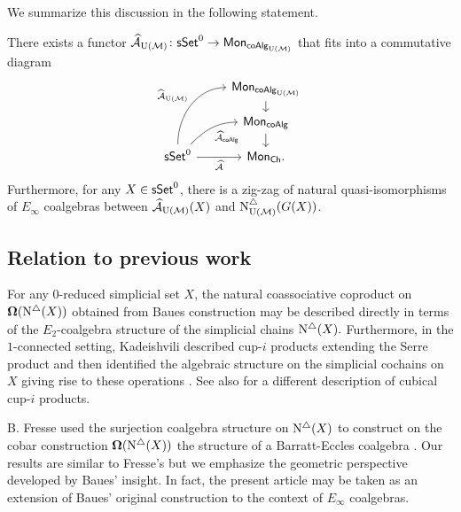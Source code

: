 We summarize this discussion in the following statement.

\begin{theorem} \label{t:2nd main thm in the intro} There exists a functor $\operatorname{\mathcal{\widehat{A}}}_{\mathrm{U}(\mathcal{M})} \colon \mathsf{sSet}^0 \to \mathsf{Mon}_{\mathsf{coAlg}_{\mathrm{U}(\mathcal{M})}}$ that fits into a commutative diagram
	\begin{equation*}
	\begin{tikzcd}[row sep=small]
	& \Mon_{\coAlg_\UM} \arrow[d] \\
	& \Mon_{\coAlg} \arrow[d] \\
	\sSet^0
	\arrow[r, "\Ahat"', ]
	\arrow[ru, "\Ahat_{\coAlg}"', out=45, in=180] 
	\arrow[ruu, "\widehat{\A}_\UM", out=90, in=180]
	& \Mon_{\Ch}.
	\end{tikzcd}
	\end{equation*}
	Furthermore, for any $X \in \mathsf{sSet}^0$, there is a zig-zag of natural quasi-isomorphisms of $E_{\infty}$ coalgebras between $\operatorname{\mathcal{\widehat{A}}}_{\mathrm{U}(\mathcal{M})}(X)$ and $\operatorname{N^{\triangle}_{{\mathrm{U}(\mathcal{M})}}}(G(X))$.
\end{theorem}


\subsection*{Relation to previous work}

For any $0$-reduced simplicial set $X$, the natural coassociative coproduct on $\operatorname{\mathbf{\Omega}} (\operatorname{N^{\triangle}} (X))$ obtained from Baues construction may be described directly in terms of the $E_2$-coalgebra structure of the simplicial chains $\operatorname{N^{\triangle}}(X).$ Furthermore, in the $1$-connected setting, Kadeishvili described cup-$i$ products extending the Serre product and then identified the algebraic structure on the simplicial cochains on $X$ giving rise to these operations \cite{kadeishvili1999coproducts, kadeishvili2003cup-i}.
See also \cite{pilarczyk2016cubical} for a different description of cubical cup-$i$ products.

B. Fresse used the surjection coalgebra structure on $\operatorname{N^{\triangle}}(X)$ to construct on the cobar construction $\operatorname{\mathbf{\Omega}}(\operatorname{N^{\triangle}}(X))$ the  structure of a Barratt-Eccles coalgebra \cite{fresse2003hopf}.
Our results are similar to Fresse's but we emphasize the geometric perspective developed by Baues' insight.
In fact, the present article may be taken as an extension of Baues' original construction to the context of $E_{\infty}$ coalgebras. 

